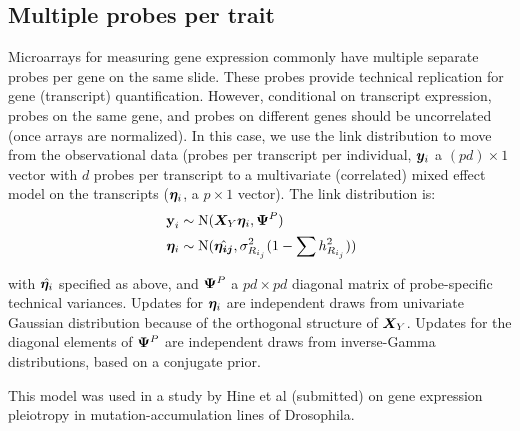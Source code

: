 \documentclass[11pt]{amsart}
\newcommand*{\B}[1]{\ifmmode\bm{#1}\else\textbf{#1}\fi}
\begin{document}
\subsection{Multiple probes per trait}
Microarrays for measuring gene expression commonly have multiple separate probes per gene on the same slide. These probes provide technical replication for gene (transcript) quantification. However, conditional on transcript expression, probes on the same gene, and probes on different genes should be uncorrelated (once arrays are normalized). In this case, we use the link distribution to move from the observational data (probes per transcript per individual, $\B{y}_i$ a $(p d) \times 1$ vector with $d$ probes per transcript to a multivariate (correlated) mixed effect model on the transcripts ($\B{\eta}_i$, a $p \times 1$ vector). The link distribution is:
\begin{align} \begin{split}
\B{y}_i &\sim \mbox{N}(\B{X}_Y \B{\eta}_i, \B{\Psi}^P) \\
\;\B{\eta}_i &\sim \mbox{N}(\hat{\B{\eta_{ij}}},\sigma^2_{R_{i_j}}(1-\sum h^2_{R_{i_j}}))
\end{split}\end{align}

\noindent with $\hat{\B{\eta}_i}$ specified as above, and $\B{\Psi}^P$ a $pd \times pd$ diagonal matrix of probe-specific technical variances. Updates for $\B{\eta}_i$ are independent draws from univariate Gaussian distribution because of the orthogonal structure of $\B{X}_Y$. Updates for the diagonal elements of $\B{\Psi}^P$ are independent draws from inverse-Gamma distributions, based on a conjugate prior.

This model was used in a study by Hine et al (submitted) on gene expression pleiotropy in mutation-accumulation lines of Drosophila.
\end{document}

